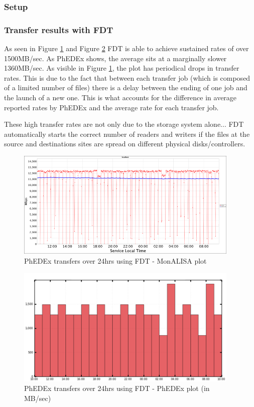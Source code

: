 \subsubsection{Setup}

\subsubsection{Transfer results with FDT}

As seen in Figure \ref{fig:FDT-Transfers} and Figure \ref{fig:FDT-Transfers-PhEDEx}
FDT is able to achieve sustained rates of over 1500MB/sec. As PhEDEx shows,
the average sits at a marginally slower 1360MB/sec. As visible in 
Figure \ref{fig:FDT-Transfers}, the plot has periodical drops in transfer rates.
This is due to the fact that between each transfer job (which is composed of a limited
number of files) there is a delay between the ending of one job and the launch of
a new one. This is what accounts for the difference in average reported rates by PhEDEx
and the average rate for each transfer job.

These high transfer rates are not only due to the storage system alone... FDT 
automatically starts the correct number of readers and writers if the files at 
the source and destinations sites are spread on different physical disks/controllers.

\begin{figure}[h]
  \centering
  \includegraphics[width=0.95\textwidth]{Figures/FDT-transfers.png}
  \caption{PhEDEx transfers over 24hrs using FDT - MonALISA plot}
  \label{fig:FDT-Transfers}
\end{figure} 

\begin{figure}[h]
  \centering
  \includegraphics[width=0.95\textwidth]{Figures/FDT-transfers-PhEDEx.png}
  \caption{PhEDEx transfers over 24hrs using FDT - PhEDEx plot (in MB/sec)}
  \label{fig:FDT-Transfers-PhEDEx}
\end{figure} 


